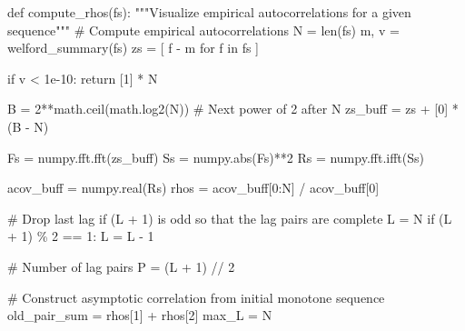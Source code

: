 \documentclass[
  letterpaper,
  DIV=11,
  numbers=noendperiod]{scrartcl}
\newenvironment{Shaded}{\begin{snugshade}}{\end{snugshade}}
\newcommand{\BuiltInTok}[1]{\textcolor[rgb]{0.00,0.23,0.31}{#1}}
\newcommand{\CommentTok}[1]{\textcolor[rgb]{0.37,0.37,0.37}{#1}}
\newcommand{\ControlFlowTok}[1]{\textcolor[rgb]{0.00,0.23,0.31}{#1}}
\newcommand{\DecValTok}[1]{\textcolor[rgb]{0.68,0.00,0.00}{#1}}
\newcommand{\FloatTok}[1]{\textcolor[rgb]{0.68,0.00,0.00}{#1}}
\newcommand{\KeywordTok}[1]{\textcolor[rgb]{0.00,0.23,0.31}{#1}}
\newcommand{\NormalTok}[1]{\textcolor[rgb]{0.00,0.23,0.31}{#1}}
\newcommand{\OperatorTok}[1]{\textcolor[rgb]{0.37,0.37,0.37}{#1}}
\begin{document}
\begin{Shaded}
\begin{Highlighting}[]
\KeywordTok{def}\NormalTok{ compute\_rhos(fs):}
  \CommentTok{"""Visualize empirical autocorrelations for a given sequence"""}
  \CommentTok{\# Compute empirical autocorrelations}
\NormalTok{  N }\OperatorTok{=} \BuiltInTok{len}\NormalTok{(fs)}
\NormalTok{  m, v }\OperatorTok{=}\NormalTok{ welford\_summary(fs)}
\NormalTok{  zs }\OperatorTok{=}\NormalTok{ [ f }\OperatorTok{{-}}\NormalTok{ m }\ControlFlowTok{for}\NormalTok{ f }\KeywordTok{in}\NormalTok{ fs ]}
  
  \ControlFlowTok{if}\NormalTok{ v }\OperatorTok{\textless{}} \FloatTok{1e{-}10}\NormalTok{:}
    \ControlFlowTok{return}\NormalTok{ [}\DecValTok{1}\NormalTok{] }\OperatorTok{*}\NormalTok{ N}
  
\NormalTok{  B }\OperatorTok{=} \DecValTok{2}\OperatorTok{**}\NormalTok{math.ceil(math.log2(N)) }\CommentTok{\# Next power of 2 after N}
\NormalTok{  zs\_buff }\OperatorTok{=}\NormalTok{ zs }\OperatorTok{+}\NormalTok{ [}\DecValTok{0}\NormalTok{] }\OperatorTok{*}\NormalTok{ (B }\OperatorTok{{-}}\NormalTok{ N)}
  
\NormalTok{  Fs }\OperatorTok{=}\NormalTok{ numpy.fft.fft(zs\_buff)}
\NormalTok{  Ss }\OperatorTok{=}\NormalTok{ numpy.}\BuiltInTok{abs}\NormalTok{(Fs)}\OperatorTok{**}\DecValTok{2}
\NormalTok{  Rs }\OperatorTok{=}\NormalTok{ numpy.fft.ifft(Ss)}
  
\NormalTok{  acov\_buff }\OperatorTok{=}\NormalTok{ numpy.real(Rs)}
\NormalTok{  rhos }\OperatorTok{=}\NormalTok{ acov\_buff[}\DecValTok{0}\NormalTok{:N] }\OperatorTok{/}\NormalTok{ acov\_buff[}\DecValTok{0}\NormalTok{]}
  
  \CommentTok{\# Drop last lag if (L + 1) is odd so that the lag pairs are complete}
\NormalTok{  L }\OperatorTok{=}\NormalTok{ N}
  \ControlFlowTok{if}\NormalTok{ (L }\OperatorTok{+} \DecValTok{1}\NormalTok{) }\OperatorTok{\%} \DecValTok{2} \OperatorTok{==} \DecValTok{1}\NormalTok{:}
\NormalTok{    L }\OperatorTok{=}\NormalTok{ L }\OperatorTok{{-}} \DecValTok{1}
  
  \CommentTok{\# Number of lag pairs}
\NormalTok{  P }\OperatorTok{=}\NormalTok{ (L }\OperatorTok{+} \DecValTok{1}\NormalTok{) }\OperatorTok{//} \DecValTok{2}
  
  \CommentTok{\# Construct asymptotic correlation from initial monotone sequence}
\NormalTok{  old\_pair\_sum }\OperatorTok{=}\NormalTok{ rhos[}\DecValTok{1}\NormalTok{] }\OperatorTok{+}\NormalTok{ rhos[}\DecValTok{2}\NormalTok{]}
\NormalTok{  max\_L }\OperatorTok{=}\NormalTok{ N}
  

\end{Highlighting}
\end{Shaded}
\end{document}
